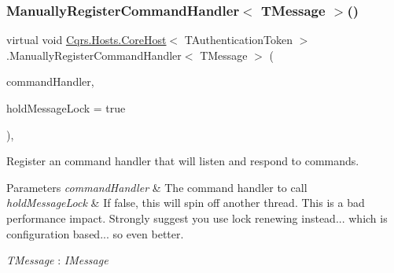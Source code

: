 \subsubsection{\texorpdfstring{Manually\+Register\+Command\+Handler$<$ T\+Message $>$()}{ManuallyRegisterCommandHandler< TMessage >()}}
{\footnotesize\ttfamily virtual void \hyperlink{classCqrs_1_1Hosts_1_1CoreHost}{Cqrs.\+Hosts.\+Core\+Host}$<$ T\+Authentication\+Token $>$.Manually\+Register\+Command\+Handler$<$ T\+Message $>$ (\begin{DoxyParamCaption}\item[{Action$<$ T\+Message $>$}]{command\+Handler,  }\item[{bool}]{hold\+Message\+Lock = {\ttfamily true} }\end{DoxyParamCaption})\hspace{0.3cm}{\ttfamily [protected]}, {\ttfamily [virtual]}}



Register an command handler that will listen and respond to commands. 


\begin{DoxyParams}{Parameters}
{\em command\+Handler} & The command handler to call\\
\hline
{\em hold\+Message\+Lock} & If false, this will spin off another thread. This is a bad performance impact. Strongly suggest you use lock renewing instead... which is configuration based... so even better.\\
\hline
\end{DoxyParams}
\begin{Desc}
\item[Type Constraints]\begin{description}
\item[{\em T\+Message} : {\em I\+Message}]\end{description}
\end{Desc}
\mbox{\label{classCqrs_1_1Hosts_1_1CoreHost_afd0a6b149a8b5ce0e9be016f422f06f9_afd0a6b149a8b5ce0e9be016f422f06f9}} 
